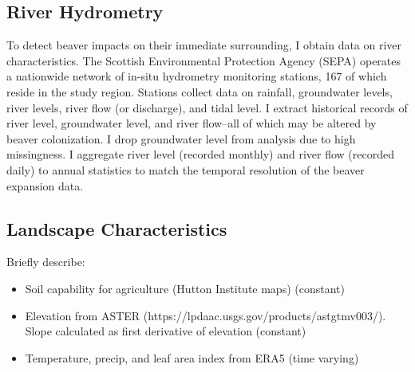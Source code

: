 \subsection{River Hydrometry}
To detect beaver impacts on their immediate surrounding, I obtain data on river characteristics. The Scottish Environmental Protection Agency (SEPA) operates a nationwide network of in-situ hydrometry monitoring stations, 167 of which reside in the study region. Stations collect data on rainfall, groundwater levels, river levels, river flow (or discharge), and tidal level. I extract historical records of river level, groundwater level, and river flow--all of which may be altered by beaver colonization. I drop groundwater level from analysis due to high missingness. I aggregate river level (recorded monthly) and river flow (recorded daily) to annual statistics to match the temporal resolution of the beaver expansion data.

\subsection{Landscape Characteristics}

Briefly describe: 

\begin{itemize}
    \item Soil capability for agriculture (Hutton Institute maps) (constant)
    \item Elevation from ASTER (https://lpdaac.usgs.gov/products/astgtmv003/). Slope calculated as first derivative of elevation (constant)
    \item Temperature, precip, and leaf area index from ERA5 (time varying)
\end{itemize}

